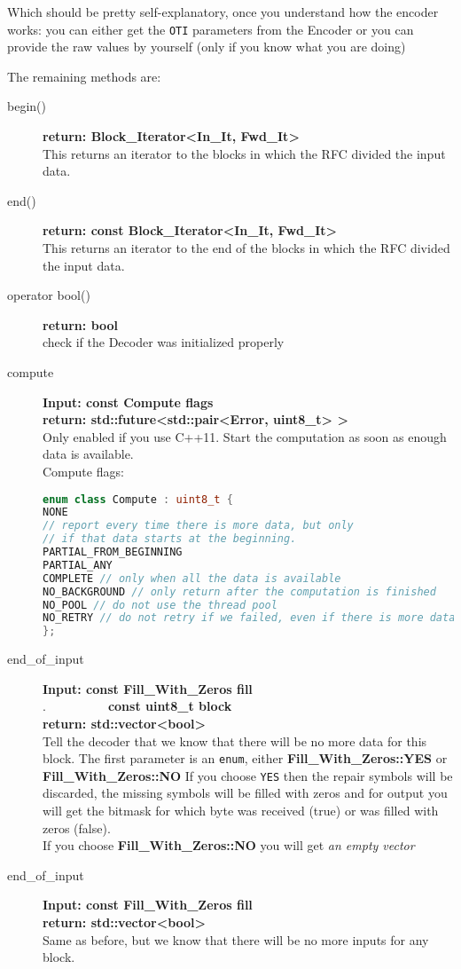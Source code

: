 \documentclass[11pt,a4paper]{refart}
\begin{document}
Which should be pretty self-explanatory, once you understand how the encoder works:
you can either get the \texttt{OTI} parameters from the Encoder or you can provide the raw values by yourself (only if you know what you are doing)

The remaining methods are:
\begin{description}
\item[begin()] \textbf{return: Block\_Iterator<In\_It, Fwd\_It>}\\
This returns an iterator to the blocks in which the RFC divided the input data.
\item[end()] \textbf{return: const Block\_Iterator<In\_It, Fwd\_It>}\\
This returns an iterator to the end of the blocks in which the RFC divided the input data.
\item[operator bool()] \textbf{return: bool}\\
check if the Decoder was initialized properly

\item[compute] \textbf{Input: const Compute flags}\\
\textbf{return: std::future<std::pair<Error, uint8\_t> >}\\
Only enabled if you use C++11. Start the computation as soon as enough data is available.\\
Compute flags:
\begin{lstlisting}[language=C++]
enum class Compute : uint8_t {
NONE 
// report every time there is more data, but only
// if that data starts at the beginning.
PARTIAL_FROM_BEGINNING
PARTIAL_ANY
COMPLETE // only when all the data is available
NO_BACKGROUND // only return after the computation is finished
NO_POOL // do not use the thread pool
NO_RETRY // do not retry if we failed, even if there is more data
};
\end{lstlisting}

\item[end\_of\_input] \textbf{Input: const Fill\_With\_Zeros fill}\\
.\ \ \ \ \ \ \ \ \ \ \textbf{const uint8\_t block}\\
\textbf{return: std::vector<bool>}\\
Tell the decoder that we know that there will be no more data for this block.
The first parameter is an \texttt{enum}, either \textbf{Fill\_With\_Zeros::YES}  or \textbf{Fill\_With\_Zeros::NO}
If you choose \texttt{YES} then the repair symbols will be discarded, the missing symbols will be filled with zeros
and for output you will get the bitmask for which byte was received (true) or was filled with zeros (false).\\
If you choose \textbf{Fill\_With\_Zeros::NO} you will get \textit{an empty vector}
\item[end\_of\_input] \textbf{Input: const Fill\_With\_Zeros fill}\\
\textbf{return: std::vector<bool>}\\
Same as before, but we know that there will be no more inputs for any block.



\end{description}
\end{document}
